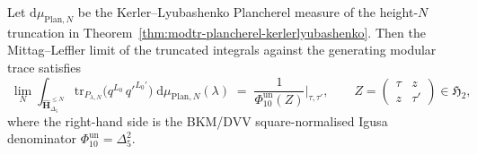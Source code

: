 \begin{theorem}
\label{thm:modtr-plancherel-equals-phi10}
Let $\mathrm d\mu_{\mathrm{Plan},N}$ be the Kerler--Lyubashenko
Plancherel measure of the height-\(N\) truncation in
Theorem~\ref{thm:modtr-plancherel-kerlerlyubashenko}. Then the
Mittag--Leffler limit of the truncated integrals against the generating
modular trace satisfies
\[
 \boxed{\;
 \lim_N
 \int_{\widehat{\mathbf H}_{\Delta_5}^{\leq N}}
 \mathrm{tr}_{P_{\lambda,N}}\!\bigl(q^{L_0}\,q'^{L_0'}\bigr)
 \;\mathrm d\mu_{\mathrm{Plan},N}(\lambda)
 \;=\;
 \frac{1}{\Phi_{10}^{\mathrm{un}}(Z)}\Big|_{\tau,\tau'},
 \qquad
 Z = \begin{pmatrix}\tau & z\\ z & \tau'\end{pmatrix}\in\mathfrak H_2,\;}
\]
where the right-hand side is the BKM/DVV square-normalised Igusa
denominator \(\Phi_{10}^{\mathrm{un}}=\Delta_5^2\).
\end{theorem}

